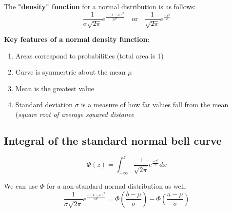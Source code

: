 \documentclass[titlepage, 12pt, leqno]{article}
\begin{document}
The \textbf{"density" function} for a normal distribution is as follows:
\[
\frac{1}{\sigma\sqrt{2\pi }}e^{\frac{-(x-\mu)^2}{2\sigma^2}} \quad \text{or} \quad \frac{1}{\sqrt{2\pi }} e^{\frac{-x^2}{2}}
\]

\textbf{Key features of a normal density function}:
\begin{enumerate}
    \item Areas correspond to probabilities (total area is 1)
    \item Curve is symmertric about the mean $\mu$ 
    \item Mean is the greatest value
    \item Standard deviation $\sigma$ is a measure of how far values fall from the mean (\textit{square root of average squared distance} 
\end{enumerate}

\subsection{Integral of the standard normal bell curve}
\[
    \Phi(z) = \int_{-\infty}^{z}\frac{1}{\sqrt{2\pi}} e^{\frac{-x^2}{2}} dx
\]

We can use $\Phi$ for a non-standard normal distribution as well:
\[
\frac{1}{\sigma\sqrt{2\pi }}e^{\frac{-(x-\mu)^2}{2\sigma^2}} = \Phi\left(\frac{b-\mu}{\sigma}\right) - \Phi\left(\frac{a-\mu}{\sigma}\right) 
\]
\end{document}
